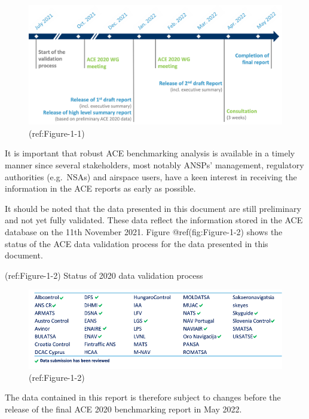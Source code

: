 \documentclass[
]{book}
\begin{document}
\begin{figure}

{\centering \includegraphics[width=0.8\linewidth]{figures/Figure-1-1} 

}

\caption{(ref:Figure-1-1)}\label{fig:Figure-1-1}
\end{figure}

It is important that robust ACE benchmarking analysis is available in a
timely manner since several stakeholders, most notably ANSPs'
management, regulatory authorities (e.g.~NSAs) and airspace users, have
a keen interest in receiving the information in the ACE reports as early
as possible.

It should be noted that the data presented in this document are still
preliminary and not yet fully validated. These data reflect the
information stored in the ACE database on the 11th November 2021. Figure
@ref(fig:Figure-1-2) shows the status of the ACE data validation process
for the data presented in this document.

(ref:Figure-1-2) Status of 2020 data validation process

\begin{figure}

{\centering \includegraphics[width=0.8\linewidth]{figures/Figure-1-2} 

}

\caption{(ref:Figure-1-2)}\label{fig:Figure-1-2}
\end{figure}

The data contained in this report is therefore subject to changes before
the release of the final ACE 2020 benchmarking report in May 2022.
\end{document}
